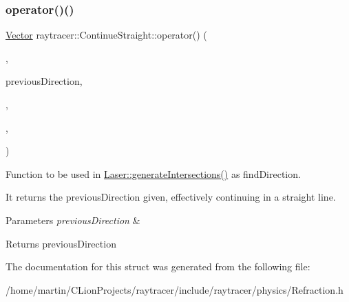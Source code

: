 \subsubsection{\texorpdfstring{operator()()}{operator()()}}
{\footnotesize\ttfamily \hyperlink{classraytracer_1_1Vector}{Vector} raytracer\+::\+Continue\+Straight\+::operator() (\begin{DoxyParamCaption}\item[{const \hyperlink{structraytracer_1_1PointOnFace}{Point\+On\+Face} \&}]{,  }\item[{const \hyperlink{classraytracer_1_1Vector}{Vector} \&}]{previous\+Direction,  }\item[{const \hyperlink{classraytracer_1_1Element}{Element} \&}]{,  }\item[{const \hyperlink{classraytracer_1_1Element}{Element} \&}]{,  }\item[{const \hyperlink{classraytracer_1_1LaserRay}{Laser\+Ray} \&}]{ }\end{DoxyParamCaption})\hspace{0.3cm}{\ttfamily [inline]}}



Function to be used in \hyperlink{classraytracer_1_1Laser_a40fd2b112fb1de646861d7e93ac303e3}{Laser\+::generate\+Intersections()} as find\+Direction. 

It returns the previous\+Direction given, effectively continuing in a straight line. 
\begin{DoxyParams}{Parameters}
{\em previous\+Direction} & \\
\hline
\end{DoxyParams}
\begin{DoxyReturn}{Returns}
previous\+Direction 
\end{DoxyReturn}


The documentation for this struct was generated from the following file\+:\begin{DoxyCompactItemize}
\item 
/home/martin/\+C\+Lion\+Projects/raytracer/include/raytracer/physics/Refraction.\+h\end{DoxyCompactItemize}
